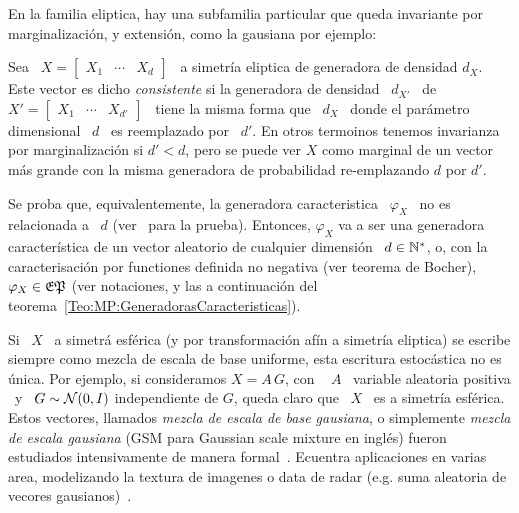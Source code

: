 En la familia  eliptica, hay una subfamilia particular  que queda invariante por
marginalizaci\'on, y extensi\'on, como la gausiana por ejemplo:
%
\begin{definicion}
%
  Sea \  $X = \begin{bmatrix} X_1 &  \cdots & X_d \end{bmatrix}$  \ a simetr\'ia
  eliptica  de  generadora  de  densidad  $d_X$.   Este  vector  es  dicho  {\em
    consistente}   si  la   generadora  de   densidad  \   $d_{X'}$  \   de  $X'
  = \begin{bmatrix} X_1 & \cdots &  X_{d'} \end{bmatrix}$ \ tiene la misma forma
  que \ $d_X$  \ donde el par\'ametro  dimensional \ $d$ \ es  reemplazado por \
  $d'$.  En  otros termoinos tenemos  invarianza por marginalizaci\'on si  $d' <
  d$, pero se puede ver $X$ como marginal de un vector m\'as grande con la misma
  generadora de probabilidad re-emplazando $d$ por $d'$.

  Se proba  que, equivalentemente, la generadora caracteristica  \ $\varphi_X$ \
  no  es  relacionada a  \  $d$  (ver~\cite{Kan94,  FanKot90} para  la  prueba).
  Entonces, $\varphi_X$  va a ser  una generadora caracter\'istica de  un vector
  aleatorio   de  cualquier   dimensi\'on  \   $d  \in   \mathbb{N}^*$,  o,   con  la
  caracterisaci\'on por functiones definida no negativa (ver teorema de Bocher),
  \  $\varphi_X  \in  \mathfrak{EP}$  (ver   notaciones,  y  las  a  continuaci\'on  del
  teorema~\ref{Teo:MP:GeneradorasCaracteristicas}).
\end{definicion}


Si \  $X$ \ a simetr\'a  esf\'erica (y por transformaci\'on  af\'in a simetr\'ia
eliptica)  se escribe  siempre  como mezcla  de  escala de  base uniforme,  esta
escritura estoc\'astica  no es \'unica. Por  ejemplo, si consideramos $X  = A \,
G$, con \
$A$ \ variable  aleatoria positiva \ y \ $G \sim  \mathcal{N}(0,I)$ independiente de $G$,
queda claro que \ $X$ \  es a simetr\'ia esf\'erica. Estos vectores, llamados {\em
  mezcla  de escala  de  base gausiana},  o  simplemente {\em  mezcla de  escala
  gausiana}  (GSM para  Gaussian scale  mixture en  ingl\'es)  fueron estudiados
intensivamente de manera formal~\cite{Kan94,  Yao73, Ver64, Pic70, Kel71, Kin72,
  KeiSte74, Tei60, AndMal74}.  Ecuentra aplicaciones en varias area, modelizando
la  textura  de imagenes  o  data  de radar  (e.g.   suma  aleatoria de  vecores
gausianos)~\cite{PorStr03,   BomBea08,  Sel08,  ShiSel07,   ZozVig10,  TisNic04,
  TodTab07}.

